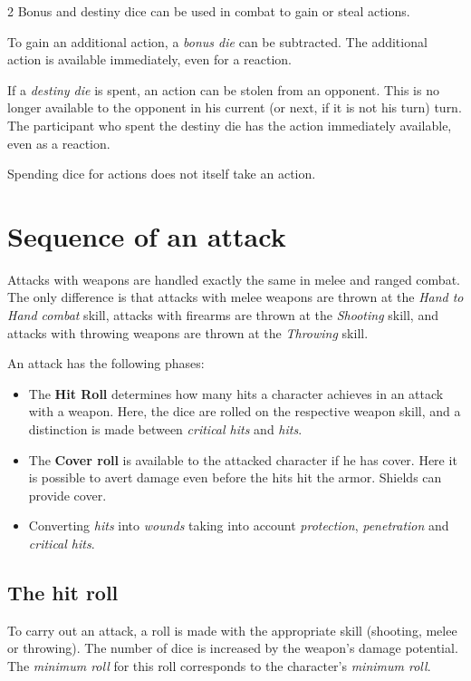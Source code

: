 \begin{multicols}{2}
Bonus and destiny dice can be used in combat to gain or steal actions.

To gain an additional action, a \textit{bonus die} can be subtracted. The additional action is available immediately, even for a reaction.

If a \textit{destiny die} is spent, an action can be stolen from an opponent. This is no longer available to the opponent in his current (or next, if it is not his turn) turn. The participant who spent the destiny die has the action immediately available, even as a reaction.

Spending dice for actions does not itself take an action.

\section{Sequence of an attack}

Attacks with weapons are handled exactly the same in melee and ranged combat. The only difference is that attacks with melee weapons are thrown at the \textit{Hand to Hand combat} skill, attacks with firearms are thrown at the \textit{Shooting} skill, and attacks with throwing weapons are thrown at the \textit{Throwing} skill.

An attack has the following phases:
\begin{itemize}
    \item The \textbf{Hit Roll} determines how many hits a character achieves in an attack with a weapon. Here, the dice are rolled on the respective weapon skill, and a distinction is made between \textit{critical hits} and \textit{hits}.
    \item The \textbf{Cover roll} is available to the attacked character if he has cover. Here it is possible to avert damage even before the hits hit the armor. Shields can provide cover.
    \item Converting \textit{hits} into \textit{wounds} taking into account \textit{protection}, \textit{penetration} and \textit{critical hits}.
\end{itemize}

\subsection{The hit roll}

To carry out an attack, a roll is made with the appropriate skill (shooting, melee or throwing). The number of dice is increased by the weapon's damage potential. The \textit{minimum roll} for this roll corresponds to the character's \textit{minimum roll}.


\end{multicols}

